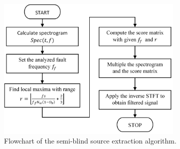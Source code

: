 \begin{figure}[ht!]
\centering
\includegraphics[width=0.8\textwidth]{wykresy/chapter_new_methods/semi_blind/algorytm_blind_source_extraction.png}
\caption{Flowchart of the semi-blind  source extraction algorithm.}
\label{fig:semi-blind algorytm}
\end{figure}


